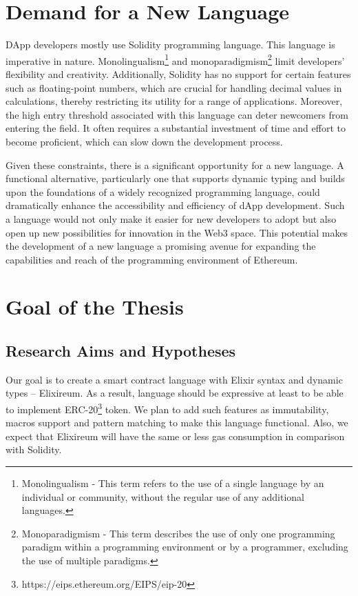 \section{Demand for a New Language}
\label{sec:langdemand}

DApp developers mostly use Solidity programming language. This language is imperative in nature. Monolingualism\footnote{Monolingualism - This term refers to the use of a single language by an individual or community, without the regular use of any additional languages.} and monoparadigmism\footnote{Monoparadigmism -  This term describes the use of only one programming paradigm within a programming environment or by a programmer, excluding the use of multiple paradigms.} limit developers' flexibility and creativity. Additionally, Solidity has no support for certain features such as floating-point numbers, which are crucial for handling decimal values in calculations, thereby restricting its utility for a range of applications. Moreover, the high entry threshold associated with this language can deter newcomers from entering the field. It often requires a substantial investment of time and effort to become proficient, which can slow down the development process.

Given these constraints, there is a significant opportunity for a new language. A functional alternative, particularly one that supports dynamic typing and builds upon the foundations of a widely recognized programming language, could dramatically enhance the accessibility and efficiency of dApp development. Such a language would not only make it easier for new developers to adopt but also open up new possibilities for innovation in the Web3 space. This potential makes the development of a new language a promising avenue for expanding the capabilities and reach of the programming environment of Ethereum.

\section{Goal of the Thesis}
\label{sec:goal}

\subsection{Research Aims and Hypotheses}
Our goal is to create a smart contract language with Elixir syntax and dynamic types -- Elixireum. As a result, language should be expressive at least to be able to implement ERC-20\footnote{https://eips.ethereum.org/EIPS/eip-20} token. We plan to add such features as immutability, macros support and pattern matching to make this language functional. Also, we expect that Elixireum will have the same or less gas consumption in comparison with Solidity.

